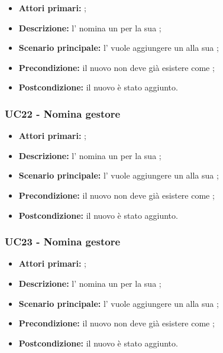 \documentclass[../analisi-dei-requisiti]{subfiles}
\begin{document}
\begin{itemize}
  \item \textbf{Attori primari:} ;
  \item \textbf{Descrizione:} l'  nomina un  per la sua ;
  \item \textbf{Scenario principale:} l'  vuole aggiungere un  alla sua ;
  \item \textbf{Precondizione:} il nuovo  non deve già esistere come ;
  \item \textbf{Postcondizione:} il nuovo  è stato aggiunto.

\end{itemize}


\subsubsection{UC22 - Nomina gestore}
\label{subsub:UC22}

\begin{itemize}
  \item \textbf{Attori primari:} ;
  \item \textbf{Descrizione:} l'  nomina un  per la sua ;
  \item \textbf{Scenario principale:} l'  vuole aggiungere un  alla sua ;
  \item \textbf{Precondizione:} il nuovo  non deve già esistere come ;
  \item \textbf{Postcondizione:} il nuovo  è stato aggiunto.

\end{itemize}


\subsubsection{UC23 - Nomina gestore}
\label{subsub:UC23}

\begin{itemize}
  \item \textbf{Attori primari:} ;
  \item \textbf{Descrizione:} l'  nomina un  per la sua ;
  \item \textbf{Scenario principale:} l'  vuole aggiungere un  alla sua ;
  \item \textbf{Precondizione:} il nuovo  non deve già esistere come ;
  \item \textbf{Postcondizione:} il nuovo  è stato aggiunto.

\end{itemize}
\end{document}
